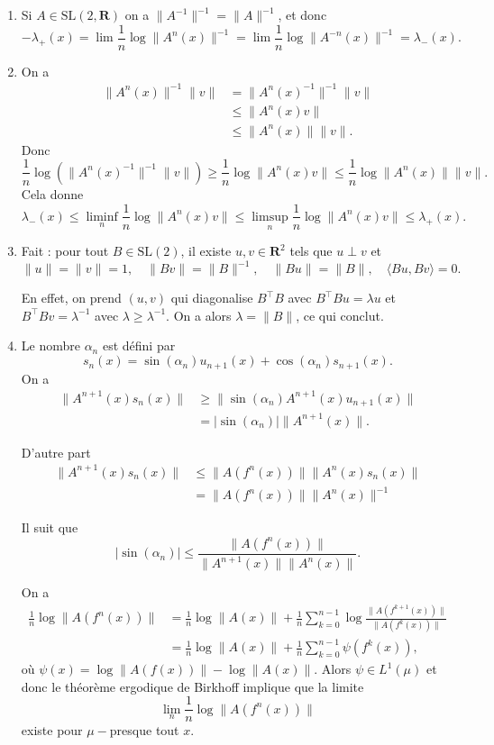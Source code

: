 \documentclass[a4paper,12pt,openany]{article}
\theoremstyle{plain}
\theoremstyle{definition}
\newcommand{\R}{\mathbf{R}}
\begin{document}
\begin{enumerate}

\item Si $A \in \mathrm{SL}(2,\R)$ on a $\|A^{-1}\|^{-1} = \|A\|^{-1}$,  et donc
$$
-\lambda_+(x) = \lim \frac{1}{n} \log \|A^n(x)\|^{-1} = \lim \frac{1}{n} \log \|A^{-n}(x)\|^{-1} = \lambda_-(x).
$$

\item On a 
$$
\begin{aligned}
\|A^n(x)\|^{-1}\|v\| &= \|A^n(x)^{-1}\|^{-1}\|v\|  \\
&\leqslant \|A^n(x)v\|  \\
&\leqslant \|A^n(x)\|\|v\|.
\end{aligned}
$$
Donc 
$$
\frac{1}{n} \log \left(\|A^n(x)^{-1}\|^{-1}\|v\|\right) \geqslant \frac{1}{n} \log \|A^n(x)v\| \leqslant \frac{1}{n} \log \|A^n(x)\| \|v\|.
$$
Cela donne
$$
\lambda_-(x) \leqslant \liminf_n  \frac{1}{n} \log \|A^n(x)v\| \leqslant \limsup_n  \frac{1}{n} \log \|A^n(x)v\| \leqslant \lambda_+(x).
$$

\item Fait : pour tout $B \in \mathrm{SL}(2)$, il existe $u,v \in \R^2$ tels que $u\perp v$ et
$$
\|u\| = \|v\| = 1, \quad \|Bv\| = \|B\|^{-1}, \quad \|Bu\| = \|B\|, \quad \langle Bu, Bv \rangle =0.
$$
 
En effet, on prend $(u,v)$ qui diagonalise $B^\top B$ avec $B^{\top} B u = \lambda u$ et $B^\top B v = \lambda^{-1}$ avec $\lambda \geqslant \lambda^{-1}$. On a alors $\lambda = \|B\|$, ce qui conclut. 

\item Le nombre $\alpha_n$ est d\'efini par 
$$
s_n(x) = \sin(\alpha_n) u_{n+1}(x) + \cos(\alpha_n) s_{n+1}(x).
$$
 On a 
$$
\begin{aligned}
\|A^{n+1}(x)s_n(x)\| &\geqslant \|\sin(\alpha_n) A^{n+1}(x) u_{n+1}(x)\|  \\
&= |\sin(\alpha_n)| \|A^{n+1}(x)\|.
\end{aligned}
$$

D'autre part
$$
\begin{aligned}
\|A^{n+1}(x)s_n(x)\| &\leqslant \|A(f^n(x))\|\|A^n(x) s_n(x)\|  \\
&= \|A(f^n(x))\|\|A^n(x)\|^{-1}
\end{aligned}
$$

Il suit que 
$$
|\sin(\alpha_n)| \leqslant \frac{\|A(f^n(x))\|}{\|A^{n+1}(x)\|\|A^n(x)\|}.
$$



On a 
$$
\begin{aligned}
\frac{1}{n}\log \|A(f^n(x))\| &= \frac{1}{n}\log \|A(x)\| + \frac{1}{n} \sum_{k=0}^{n-1} \log \frac{\|A(f^{k+1}(x))\|}{\|A(f^k(x))\|}  \\
&= \frac{1}{n} \log \|A(x)\| + \frac{1}{n} \sum_{k=0}^{n-1} \psi(f^k(x)),
\end{aligned}
$$
o\`u $\psi(x) = \log\|A(f(x))\| - \log \|A(x)\|$.  Alors $\psi \in L^1(\mu)$ et donc le th\'eor\`eme ergodique de Birkhoff implique que la limite 
$$
\lim_n \frac{1}{n} \log \|A(f^n(x))\|
$$
existe pour $\mu-$presque tout $x$.  


\end{enumerate}
\end{document}
